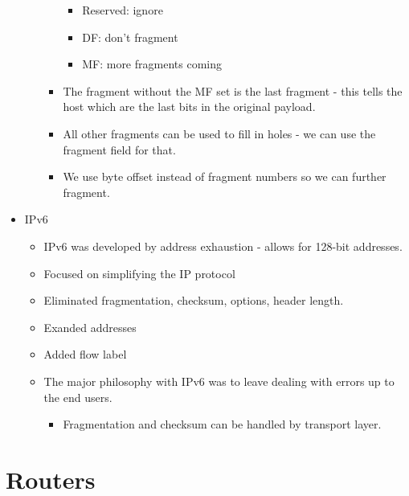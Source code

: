 \documentclass[]{article}
\providecommand{\tightlist}{%
  \setlength{\itemsep}{0pt}\setlength{\parskip}{0pt}}
\begin{document}
\begin{itemize}
\begin{itemize}
\begin{itemize}
      \begin{itemize}
      \tightlist
      \item
        Reserved: ignore
      \item
        DF: don't fragment
      \item
        MF: more fragments coming
      \end{itemize}
    \item
      The fragment without the MF set is the last fragment - this tells
      the host which are the last bits in the original payload.
    \item
      All other fragments can be used to fill in holes - we can use the
      fragment field for that.
    \item
      We use byte offset instead of fragment numbers so we can further
      fragment.
    \end{itemize}
  \end{itemize}
\item
  IPv6

  \begin{itemize}
  \tightlist
  \item
    IPv6 was developed by address exhaustion - allows for 128-bit
    addresses.
  \item
    Focused on simplifying the IP protocol
  \item
    Eliminated fragmentation, checksum, options, header length.
  \item
    Exanded addresses
  \item
    Added flow label
  \item
    The major philosophy with IPv6 was to leave dealing with errors up
    to the end users.

    \begin{itemize}
    \tightlist
    \item
      Fragmentation and checksum can be handled by transport layer.
    \end{itemize}
  \end{itemize}
\end{itemize}

\hypertarget{routers}{%
\section{Routers}\label{routers}}
\end{document}
